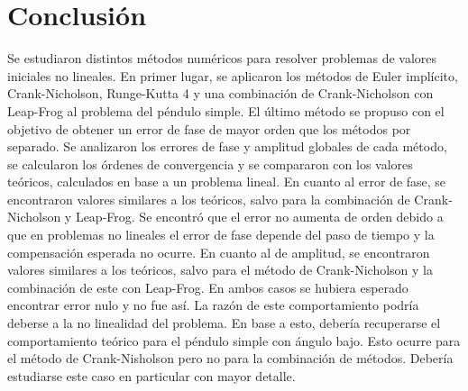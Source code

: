 \documentclass[aps,prb,twocolumn,superscriptaddress,floatfix,longbibliography]{revtex4-2}
\newcounter{para}
\begin{document}



\section{Conclusión}

Se estudiaron distintos métodos numéricos para resolver problemas de valores iniciales no lineales. En primer lugar, se aplicaron los métodos de Euler implícito, Crank-Nicholson, Runge-Kutta 4 y una combinación de Crank-Nicholson con Leap-Frog al problema del péndulo simple. El último método se propuso con el objetivo de obtener un error de fase de mayor orden que los métodos por separado. Se analizaron los errores de fase y amplitud globales de cada método, se calcularon los órdenes de convergencia y se compararon con los valores teóricos, calculados en base a un problema lineal. En cuanto al error de fase, se encontraron valores similares a los teóricos, salvo para la combinación de Crank-Nicholson y Leap-Frog. Se encontró que el error no aumenta de orden debido a que en problemas no lineales el error de fase depende del paso de tiempo y la compensación esperada no ocurre. En cuanto al de amplitud, se encontraron valores similares a los teóricos, salvo para el método de Crank-Nicholson y la combinación de este con Leap-Frog. En ambos casos se hubiera esperado encontrar error nulo y no fue así. La razón de este comportamiento podría deberse a la no linealidad del problema. En base a esto, debería recuperarse el comportamiento teórico para el péndulo simple con ángulo bajo. Esto ocurre para el método de Crank-Nisholson pero no para la combinación de métodos. Debería estudiarse este caso en particular con mayor detalle. 
\end{document}
